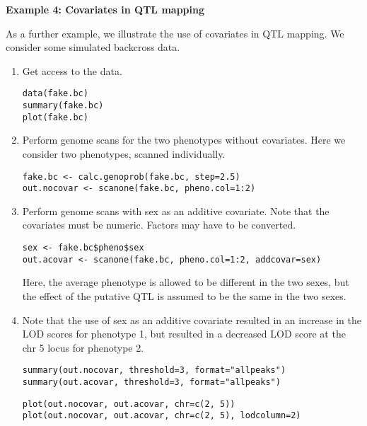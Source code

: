 \documentclass[10pt,letterpaper]{article}
\newcommand{\usercolor}{\color [named]{BlueViolet}}
\begin{document}
\vspace{12pt}

\noindent \textbf{Example 4: Covariates in QTL mapping} \vspace{6pt}
\nopagebreak

\noindent As a further example, we illustrate the use of covariates in
QTL mapping.  We consider some simulated backcross data.

\begin{enumerate}

\item Get access to the data.

\usercolor
\verb|data(fake.bc)| \\
\verb|summary(fake.bc)| \\
\verb|plot(fake.bc)| 
\normalcolor

\item Perform genome scans for the two phenotypes without covariates.
Here we consider two phenotypes, scanned individually.

\usercolor
\verb|fake.bc <- calc.genoprob(fake.bc, step=2.5)| \\
\verb|out.nocovar <- scanone(fake.bc, pheno.col=1:2)|
\normalcolor

\item Perform genome scans with sex as an additive covariate.
Note that the covariates must be numeric.  Factors may have to be
converted.

\usercolor
\verb|sex <- fake.bc$pheno$sex| \\
\verb|out.acovar <- scanone(fake.bc, pheno.col=1:2, addcovar=sex)|
\normalcolor

Here, the average phenotype is allowed to be different in the two
sexes, but the effect of the putative QTL is assumed to be the same in
the two sexes.

\item Note that the use of sex as an additive covariate resulted in an
  increase in the LOD scores for phenotype 1, but resulted  in a
  decreased LOD score at the chr 5 locus for phenotype 2.

\usercolor
\verb|summary(out.nocovar, threshold=3, format="allpeaks")| \\
\verb|summary(out.acovar, threshold=3, format="allpeaks")| 

\verb|plot(out.nocovar, out.acovar, chr=c(2, 5))| \\
\verb|plot(out.nocovar, out.acovar, chr=c(2, 5), lodcolumn=2)| 
\normalcolor


\end{enumerate}
\end{document}

